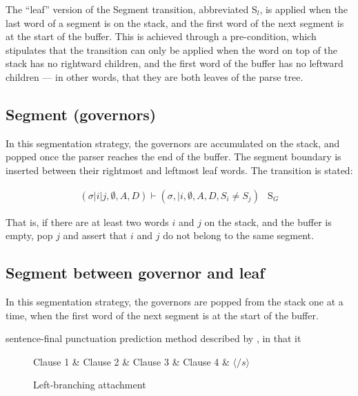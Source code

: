 \documentclass[11pt,letterpaper]{article}
\begin{document}
The ``leaf'' version of the Segment transition, abbreviated S$_l$, is applied when
the last word of a segment is on the stack, and the first word of the next segment
is at the start of the buffer.  This is achieved through a pre-condition, which
stipulates that the transition can only be applied when the word on top of the
stack has no rightward children, and the first word of the buffer has no leftward
children --- in other words, that they are both leaves of the parse tree.  

\subsection{Segment (governors)}

In this segmentation strategy, the governors are accumulated on the stack, and
popped once the parser reaches the end of the buffer.  The segment boundary is
inserted between their rightmost and leftmost leaf words.
The transition is stated:

\begin{eqnarray}
    (\sigma | i | j, \emptyset , A, D) \vdash (\sigma, | i, \emptyset, A, D, S_i \ne S_j ) & \mathrm{S}_G
\end{eqnarray}

That is, if there are at least two words $i$ and $j$ on the stack, and the buffer
is empty, pop $j$ and assert that $i$ and $j$ do not belong to the same segment.

\subsection{Segment between governor and leaf}

In this segmentation strategy, the governors are popped from the stack one at
a time, when the first word of the next segment is at the start of the buffer.

sentence-final punctuation prediction method described by \citet{zhang:13},
in that it 

\clearpage

\begin{figure}
\begin{dependency}[theme=simple, segmented edge]
    \begin{deptext}[column sep=.075cm, row sep=.1ex]
    Clause 1 \& Clause 2 \& Clause 3 \& Clause 4 \& $\langle /s \rangle$ \\
    \end{deptext}
    \end{dependency}
    \caption{Left-branching attachment}
\end{figure}
\end{document}

